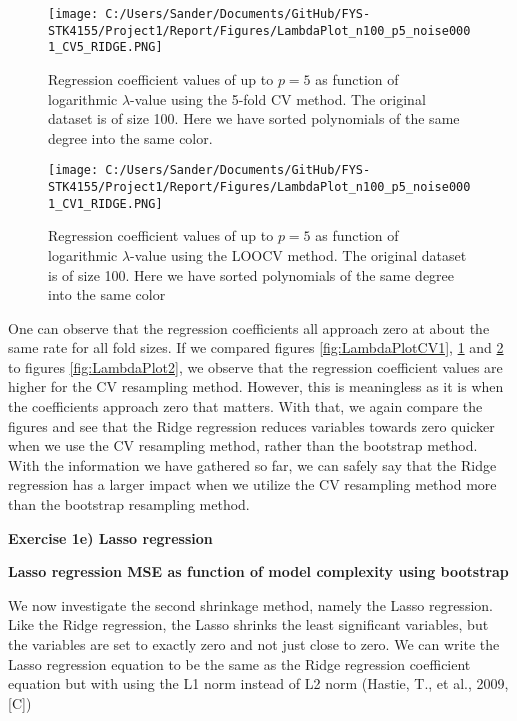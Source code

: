 \documentclass[12pt,a4paper]{article}
\begin{document}
\begin{figure}[H]
\centering
\texttt{[image: C:/Users/Sander/Documents/GitHub/FYS-STK4155/Project1/Report/Figures/LambdaPlot\_n100\_p5\_noise0001\_CV5\_RIDGE.PNG]}
\caption{\label{fig:LambdaPlotCV2} Regression coefficient values of up to $p = 5$ as function of logarithmic $\lambda$-value using the 5-fold CV method. The original dataset is of size 100. Here we have sorted polynomials of the same degree into the same color.}
\end{figure}

\begin{figure}[H]
\centering
\texttt{[image: C:/Users/Sander/Documents/GitHub/FYS-STK4155/Project1/Report/Figures/LambdaPlot\_n100\_p5\_noise0001\_CV1\_RIDGE.PNG]}
\caption{\label{fig:LambdaPlotCV3} Regression coefficient values of up to $p = 5$ as function of logarithmic $\lambda$-value using the LOOCV method. The original dataset is of size 100. Here we have sorted polynomials of the same degree into the same color}
\end{figure}

\noindent One can observe that the regression coefficients all approach zero at about the same rate for all fold sizes. If we compared figures \ref{fig:LambdaPlotCV1}, \ref{fig:LambdaPlotCV2} and \ref{fig:LambdaPlotCV3} to figures \ref{fig:LambdaPlot2}, we observe that the regression coefficient values are higher for the CV resampling method. However, this is meaningless as it is when the coefficients approach zero that matters. With that, we again compare the figures and see that the Ridge regression reduces variables towards zero quicker when we use the CV resampling method, rather than the bootstrap method.
\\
With the information we have gathered so far, we can safely say that the Ridge regression has a larger impact when we utilize the CV resampling method more than the bootstrap resampling method.

\newpage

\begin{center}
\Large{\textbf{Exercise 1e) Lasso regression}}
\end{center}

\begin{center}
\large{\textbf{Lasso regression MSE as function of model complexity using bootstrap}}
\end{center}

\noindent We now investigate the second shrinkage method, namely the Lasso regression. Like the Ridge regression, the Lasso shrinks the least significant variables, but the variables are set to exactly zero and not just close to zero. We can write the Lasso regression equation to be the same as the Ridge regression coefficient equation but with using the L1 norm instead of L2 norm (Hastie, T., et al., 2009, [C])
\end{document}
